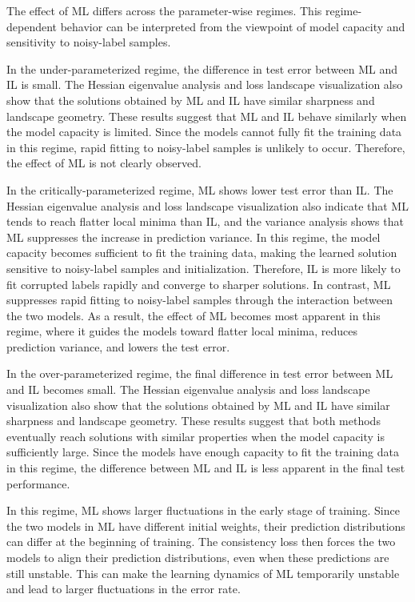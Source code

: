 \documentclass[dvipdfmx]{nolta}        %
\begin{document}
The effect of ML differs across the parameter-wise regimes. This regime-dependent behavior can be interpreted from the viewpoint of model capacity and sensitivity to noisy-label samples.

In the under-parameterized regime, the difference in test error between ML and IL is small. The Hessian eigenvalue analysis and loss landscape visualization also show that the solutions obtained by ML and IL have similar sharpness and landscape geometry. These results suggest that ML and IL behave similarly when the model capacity is limited. Since the models cannot fully fit the training data in this regime, rapid fitting to noisy-label samples is unlikely to occur. Therefore, the effect of ML is not clearly observed.

In the critically-parameterized regime, ML shows lower test error than IL. The Hessian eigenvalue analysis and loss landscape visualization also indicate that ML tends to reach flatter local minima than IL, and the variance analysis shows that ML suppresses the increase in prediction variance. In this regime, the model capacity becomes sufficient to fit the training data, making the learned solution sensitive to noisy-label samples and initialization. Therefore, IL is more likely to fit corrupted labels rapidly and converge to sharper solutions. In contrast, ML suppresses rapid fitting to noisy-label samples through the interaction between the two models. As a result, the effect of ML becomes most apparent in this regime, where it guides the models toward flatter local minima, reduces prediction variance, and lowers the test error.

In the over-parameterized regime, the final difference in test error between ML and IL becomes small. The Hessian eigenvalue analysis and loss landscape visualization also show that the solutions obtained by ML and IL have similar sharpness and landscape geometry. These results suggest that both methods eventually reach solutions with similar properties when the model capacity is sufficiently large. Since the models have enough capacity to fit the training data in this regime, the difference between ML and IL is less apparent in the final test performance.

In this regime, ML shows larger fluctuations in the early stage of training. Since the two models in ML have different initial weights, their prediction distributions can differ at the beginning of training. The consistency loss then forces the two models to align their prediction distributions, even when these predictions are still unstable. This can make the learning dynamics of ML temporarily unstable and lead to larger fluctuations in the error rate.
\end{document}
